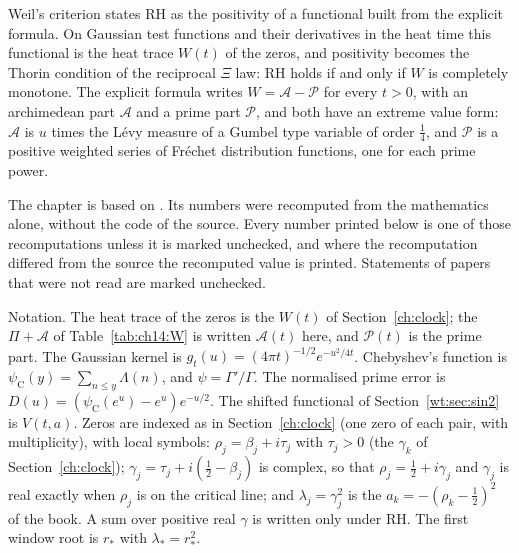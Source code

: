 \label{chap:wt}

Weil's criterion states RH as the positivity of a functional built from the explicit formula. On Gaussian test functions and their derivatives in the heat time this functional is the heat trace $W(t)$ of the zeros, and positivity becomes the Thorin condition of the reciprocal $\Xi$ law: RH holds if and only if $W$ is completely monotone. The explicit formula writes $W=\mathcal A-\mathcal P$ for every $t>0$, with an archimedean part $\mathcal A$ and a prime part $\mathcal P$, and both have an extreme value form: $\mathcal A$ is $u$ times the L\'evy measure of a Gumbel type variable of order $\frac14$, and $\mathcal P$ is a positive weighted series of Fr\'echet distribution functions, one for each prime power.

The chapter is based on \cite{P26wt}. Its numbers were recomputed from the mathematics alone, without the code of the source. Every number printed below is one of those recomputations unless it is marked unchecked, and where the recomputation differed from the source the recomputed value is printed. Statements of papers that were not read are marked unchecked.

Notation. The heat trace of the zeros is the $W(t)$ of Section~\ref{ch:clock}; the $\Pi+\mathcal A$ of Table~\ref{tab:ch14:W} is written $\mathcal A(t)$ here, and $\mathcal P(t)$ is the prime part. The Gaussian kernel is $g_t(u)=(4\pi t)^{-1/2}e^{-u^2/4t}$. Chebyshev's function is $\psi_{\mathrm C}(y)=\sum_{n\le y}\Lambda(n)$, and $\psi=\Gamma'/\Gamma$. The normalised prime error is $D(u)=(\psi_{\mathrm C}(e^u)-e^u)e^{-u/2}$. The shifted functional of Section~\ref{wt:sec:sin2} is $V(t,a)$. Zeros are indexed as in Section~\ref{ch:clock} (one zero of each pair, with multiplicity), with local symbols: $\rho_j=\beta_j+i\tau_j$ with $\tau_j>0$ (the $\gamma_k$ of Section~\ref{ch:clock}); $\gamma_j=\tau_j+i(\frac12-\beta_j)$ is complex, so that $\rho_j=\frac12+i\gamma_j$ and $\gamma_j$ is real exactly when $\rho_j$ is on the critical line; and $\lambda_j=\gamma_j^2$ is the $a_k=-(\rho_k-\frac12)^2$ of the book. A sum over positive real $\gamma$ is written only under RH. The first window root is $r_*$ with $\lambda_*=r_*^2$.


